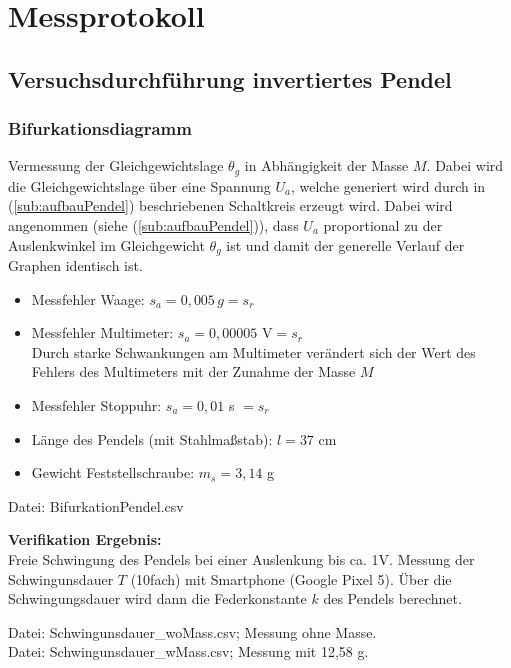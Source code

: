 

\chapter{Messprotokoll}
\label{chap:protokoll}


\section{Versuchsdurchführung invertiertes Pendel}
\label{sec:versuchPendel}
\subsection*{Bifurkationsdiagramm}
\label{sub:bifu}
Vermessung der Gleichgewichtslage $\theta_g$ in Abhängigkeit der Masse $M$. Dabei wird die Gleichgewichtslage über eine Spannung $U_a$, welche generiert wird durch in (\ref{sub:aufbauPendel}) beschriebenen Schaltkreis erzeugt wird. Dabei wird angenommen (siehe (\ref{sub:aufbauPendel})), dass $U_a$ proportional zu der Auslenkwinkel im Gleichgewicht $\theta_g$ ist und damit der generelle Verlauf der Graphen identisch ist.
\begin{itemize}
\item Messfehler Waage: $s_a = 0,005\, g = s_r$
\item Messfehler Multimeter: $s_a = 0,00005$ V$= s_r$\\
      Durch starke Schwankungen am Multimeter verändert sich der Wert des Fehlers des Multimeters mit der Zunahme der Masse $M$
\item Messfehler Stoppuhr: $s_a = 0,01$ s $=s_r$
\item Länge des Pendels (mit Stahlmaßstab): $l = 37$ cm
\item Gewicht Feststellschraube: $m_s = 3,14$ g
\end{itemize}
Datei: BifurkationPendel.csv

\textbf{Verifikation Ergebnis:}\\
Freie Schwingung des Pendels bei einer Auslenkung bis ca. 1V. Messung der Schwingunsdauer $T$ (10fach) mit Smartphone (Google Pixel 5). Über die Schwingungsdauer wird dann die Federkonstante $k$ des Pendels berechnet.

Datei: Schwingunsdauer\_woMass.csv; Messung ohne Masse.\\
Datei: Schwingunsdauer\_wMass.csv; Messung mit 12,58 g.

